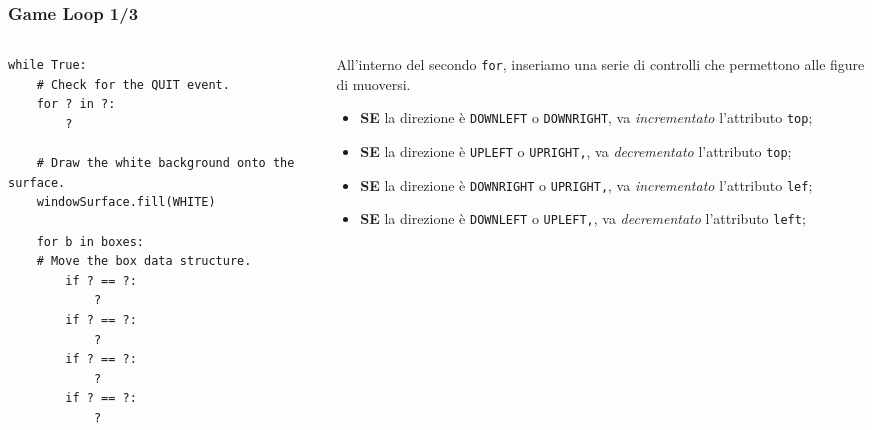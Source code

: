 \documentclass{beamer}
\begin{document}
\begin{frame}[fragile]
\frametitle{Game Loop 1/3}
\lstset{basicstyle=\tiny}
\begin{columns}
	\begin{column}[T]{0.5\textwidth}
		\begin{lstlisting}
while True:
    # Check for the QUIT event.
    for ? in ?:
		?
		
    # Draw the white background onto the surface.
    windowSurface.fill(WHITE)
    
    for b in boxes:
    # Move the box data structure.
        if ? == ?:
            ?
        if ? == ?:
            ?
        if ? == ?:
            ?
        if ? == ?:
            ?
		
		\end{lstlisting}
	\end{column}
	\begin{column}[T]{0.5\textwidth}
		All'interno del secondo \texttt{for}, inseriamo una serie di controlli che permettono alle figure di muoversi.\\
		\begin{itemize}
		\item \textbf{SE} la direzione è \texttt{DOWNLEFT} o \texttt{DOWNRIGHT}, va \textit{incrementato} l'attributo \texttt{top};
		\item \textbf{SE} la direzione è \texttt{UPLEFT} o \texttt{UPRIGHT,}, va \textit{decrementato} l'attributo \texttt{top};
		\item \textbf{SE} la direzione è \texttt{DOWNRIGHT} o \texttt{UPRIGHT,}, va \textit{incrementato} l'attributo \texttt{lef};
		\item \textbf{SE} la direzione è \texttt{DOWNLEFT} o \texttt{UPLEFT,}, va \textit{decrementato} l'attributo \texttt{left};
		\end{itemize}
		
	\end{column}
\end{columns}
\end{frame}
\end{document}

